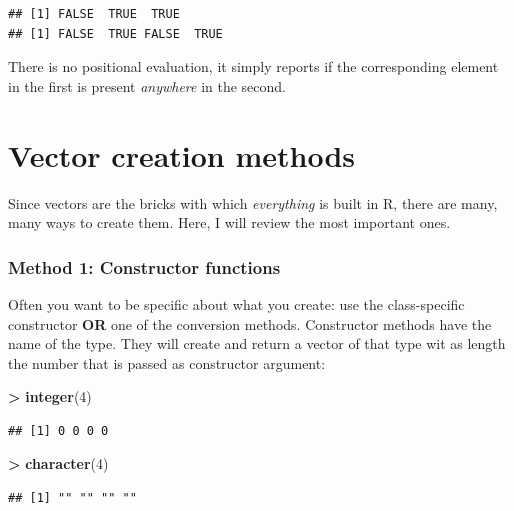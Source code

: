 \documentclass[]{book}
\newenvironment{Shaded}{\begin{snugshade}}{\end{snugshade}}
\newcommand{\DecValTok}[1]{\textcolor[rgb]{0.00,0.00,0.81}{#1}}
\newcommand{\KeywordTok}[1]{\textcolor[rgb]{0.13,0.29,0.53}{\textbf{#1}}}
\newcommand{\NormalTok}[1]{#1}
\newcommand{\OperatorTok}[1]{\textcolor[rgb]{0.81,0.36,0.00}{\textbf{#1}}}
\newcommand{\StringTok}[1]{\textcolor[rgb]{0.31,0.60,0.02}{#1}}
\begin{document}
\begin{verbatim}
## [1] FALSE  TRUE  TRUE
## [1] FALSE  TRUE FALSE  TRUE
\end{verbatim}

There is no positional evaluation, it simply reports if the corresponding element in the first is present \emph{anywhere} in the second.

\hypertarget{vector-creation-methods}{%
\section{Vector creation methods}\label{vector-creation-methods}}

Since vectors are the bricks with which \emph{everything} is built in R, there are many, many ways to create them. Here, I will review the most important ones.

\hypertarget{method-1-constructor-functions}{%
\subsubsection*{Method 1: Constructor functions}\label{method-1-constructor-functions}}

Often you want to be specific about what you create: use the class-specific constructor \textbf{OR} one of the conversion methods. Constructor methods have the name of the type. They will create and return a vector of that type wit as length the number that is passed as constructor argument:

\begin{Shaded}
\begin{Highlighting}[]
\OperatorTok{>}\StringTok{ }\KeywordTok{integer}\NormalTok{(}\DecValTok{4}\NormalTok{)}
\end{Highlighting}
\end{Shaded}

\begin{verbatim}
## [1] 0 0 0 0
\end{verbatim}

\begin{Shaded}
\begin{Highlighting}[]
\OperatorTok{>}\StringTok{ }\KeywordTok{character}\NormalTok{(}\DecValTok{4}\NormalTok{)}
\end{Highlighting}
\end{Shaded}

\begin{verbatim}
## [1] "" "" "" ""
\end{verbatim}
\end{document}
